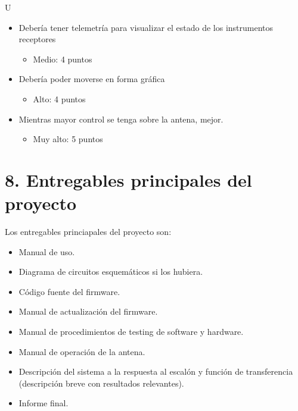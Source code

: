 \documentclass[11pt, %
codirector, %
]{charter}
\begin{document}
U\begin{itemize}
	\item Debería tener telemetría para visualizar el estado de los instrumentos receptores
		\begin{itemize}
			\item Medio: 4 puntos
		\end{itemize}

	\item Debería poder moverse en forma gráfica 
		\begin{itemize}
			\item Alto: 4 puntos
		\end{itemize}
	
	\item Mientras mayor control se tenga sobre la antena, mejor. 
		\begin{itemize}
			\item Muy alto: 5 puntos
		\end{itemize}
		

\end{itemize}

% 



\section{8. Entregables principales del proyecto}
\label{sec:entregables}



Los entregables princiapales del proyecto son:

\begin{itemize}
	\item Manual de uso. 
	\item Diagrama de circuitos esquemáticos si los hubiera. 
	\item Código fuente del firmware. 
	\item Manual de actualización del firmware.  
	\item Manual de procedimientos de testing de software y hardware.
	\item Manual de operación de la antena. 
	\item Descripción del sistema a la respuesta al escalón y función de transferencia (descripción breve con resultados relevantes).
	\item Informe final.
\end{itemize}
\end{document}
